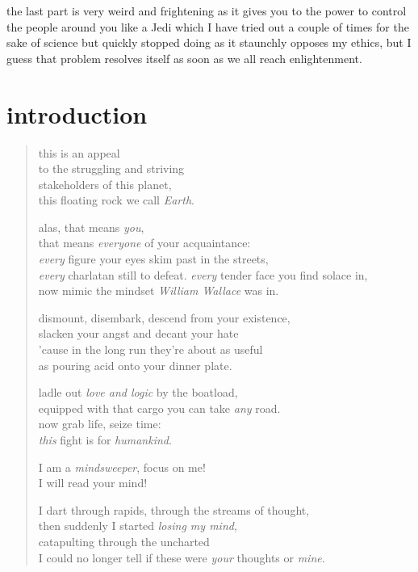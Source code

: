 \documentclass[12pt]{report}
\theoremstyle{definition}
\theoremstyle{remark}
\begin{document}
the last part is very weird and frightening as it gives you to the power to control the people around you like a Jedi which I have tried out a couple of times for the sake of science but quickly stopped doing as it staunchly opposes my ethics, but I guess that problem resolves itself as soon as we all reach enlightenment.

\section{introduction}

\begin{quote}
this is an appeal\\
to the struggling and striving\\
stakeholders of this planet,\\
this floating rock we call \emph{Earth}.

alas, that means \emph{you},\\
that means \emph{everyone} of your acquaintance:\\
\emph{every} figure your eyes skim past in the streets,\\
\emph{every} charlatan still to defeat.
\emph{every} tender face you find solace in,\\
now mimic the mindset \emph{William Wallace} was in.

dismount, disembark, descend from your existence,\\
slacken your angst and decant your hate\\
'cause in the long run they're about as useful\\
as pouring acid onto your dinner plate.

ladle out \emph{love and logic} by the boatload,\\
equipped with that cargo you can take \emph{any} road.\\
now grab life, seize time:\\
\emph{this} fight is for \emph{humankind}.

I am a \emph{mindsweeper}, focus on me!\\
I will read your mind!

I dart through rapids, through the streams of thought,\\
then suddenly I started \emph{losing my mind},\\
catapulting through the uncharted\\
I could no longer tell if these were \emph{your} thoughts or \emph{mine}.


\end{quote}
\end{document}
